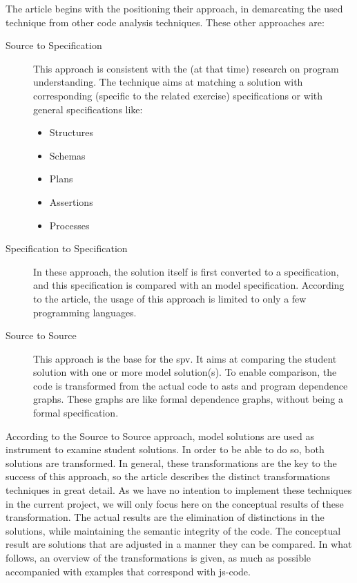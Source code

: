 The article begins with the positioning their approach, in 
demarcating the used technique from other code analysis techniques. These other
approaches are:
\begin{description}
	\item[Source to Specification] This approach is consistent with the (at that
	time) research on program understanding. The technique aims at matching a
	\gls{solution} with corresponding (specific to the related exercise) 
	specifications or with general specifications like:
	\begin{itemize}
		\item Structures
		\item Schemas
		\item Plans
		\item Assertions
		\item Processes
	\end{itemize} 
	\item[Specification to Specification] In these approach, the \gls{solution} 
	itself is first converted to a specification, and this specification is 
	compared with an model specification. According to the article, the usage
	of this approach is limited to only a few programming languages.
	\item[Source to Source] This approach is the base for the \gls{spv}. It aims
	at comparing the student \gls{solution} with one or more model \gls{solution}(s).
	To enable comparison, the \gls{code} is transformed from the actual code to
	\glspl{ast} and program dependence graphs. These graphs are like formal 
	dependence graphs, without being a formal specification.
\end{description}
According to the Source to Source approach, model solutions are used as 
instrument to examine student solutions. In order to be able to do so, both 
solutions are transformed. In general, these transformations are the key to
the success of this approach, so the article describes the distinct 
transformations techniques in great detail. As we have no intention to implement
these techniques in the current project, we will only focus here on the 
conceptual results of these transformation. The actual results are the 
elimination of distinctions in the solutions, while maintaining the semantic
integrity of the code. The conceptual result are solutions that are adjusted in 
a manner they can be compared. In what follows, an overview of the
transformations is given, as much as possible accompanied with examples that 
correspond with \gls{js-code}. 

